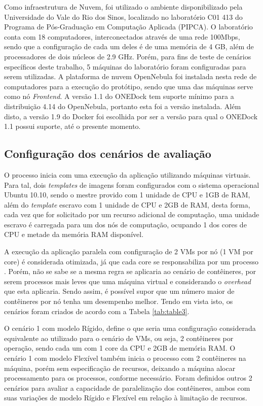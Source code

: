 \documentclass[twoside,english,brazilian]{UNISINOSartigo}
\begin{document}
Como infraestrutura de Nuvem, foi utilizado o ambiente disponibilizado pela Universidade do Vale do Rio dos Sinos, localizado no laboratório C01 413 do Programa de Pós-Graduação em Computação Aplicada (PIPCA). O laboratório conta com 18 computadores, interconectados através de uma rede 100Mbps, sendo que a configuração de cada um deles é de uma memória de 4 GB, além de processadores de dois núcleos de 2.9 GHz. Porém, para fins de teste de cenários específicos deste trabalho, 5 máquinas do laboratório foram configuradas para serem utilizadas. A plataforma de nuvem OpenNebula foi instalada nesta rede de computadores para a execução do protótipo, sendo que uma das máquinas serve como nó \textit{Frontend}. 
A versão 1.1 do ONEDock tem suporte mínimo para a distribuição 4.14 do OpenNebula, portanto esta foi a versão instalada. Além disto, a versão 1.9 do Docker foi escolhida por ser a versão para qual o ONEDock 1.1 possui suporte, até o presente momento. 

\subsection{Configuração dos cenários de avaliação}

O processo inicia com uma execução da aplicação utilizando máquinas virtuais. Para tal, dois \textit{templates} de imagens foram configurados com o sistema operacional Ubuntu 10.10, sendo o mestre provido com 1 unidade de CPU e 1GB de RAM, além do \textit{template} escravo com 1 unidade de CPU e 2GB de RAM, desta forma, cada vez que for solicitado por um recurso adicional de computação, uma unidade escravo é carregada para um dos nós de computação, ocupando 1 dos cores de CPU e metade da memória RAM disponível.

A execução da aplicação paralela com configuração de 2 VMs por nó (1 VM por core) é considerada otimizada, já que cada core se responsabiliza por um processo \cite{7090978}. Porém, não se sabe se a mesma regra se aplicaria ao cenário de contêineres, por serem processos mais leves que uma máquina virtual e considerando o \textit{overhead} que esta aplicaria. Sendo assim, é possível supor que um número maior de contêineres por nó tenha um desempenho melhor. Tendo em vista isto, os cenários foram criados de acordo com a Tabela \ref{tab:table3}.

O cenário 1 com modelo Rígido, define o que seria uma configuração considerada equivalente ao utilizado para o cenário de VMs, ou seja, 2 contêineres por operação, sendo cada um com 1 core da CPU e 2GB de memória RAM. O cenário 1 com modelo Flexível também inicia o processo com 2 contêineres na máquina, porém sem especificação de recursos, deixando a máquina alocar processamento para os processos, conforme necessário. Foram definidos outros 2 cenários para avaliar a capacidade de paralelização dos contêineres, ambos com suas variações de modelo Rígido e Flexível em relação à limitação de recursos.
\end{document}
